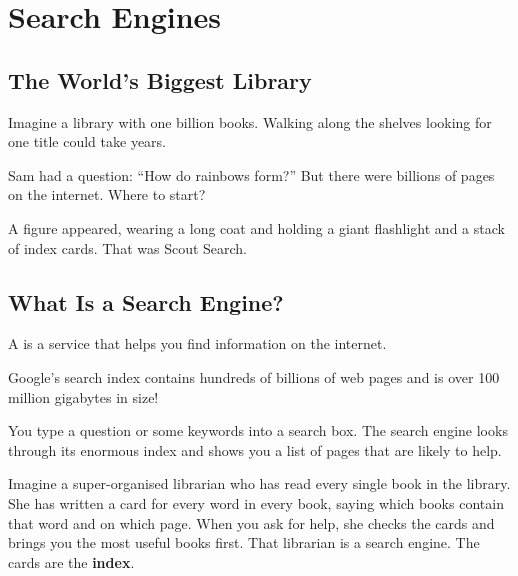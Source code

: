 
\chapter{Search Engines}


\section*{The World's Biggest Library}

Imagine a library with one billion books.
Walking along the shelves looking for one title could take years.

Sam had a question: ``How do rainbows form?''
But there were billions of pages on the internet.
Where to start?

A figure appeared, wearing a long coat and holding a giant flashlight and a stack of index cards.
That was Scout Search.


\sectionrule

\section*{What Is a Search Engine?}

A  is a service that helps you find information on the internet.

\begin{funfact}
Google's search index contains hundreds of billions of web pages and is over 100 million gigabytes in size!
\end{funfact}

You type a question or some keywords into a search box.
The search engine looks through its enormous index and shows you a list of pages
that are likely to help.

\begin{picturethis}
  Imagine a super-organised librarian who has read every single book in the library.
  She has written a card for every word in every book,
  saying which books contain that word and on which page.
  When you ask for help, she checks the cards and brings you the most useful books first.
  That librarian is a search engine.
  The cards are the \textbf{index}.
\end{picturethis}

